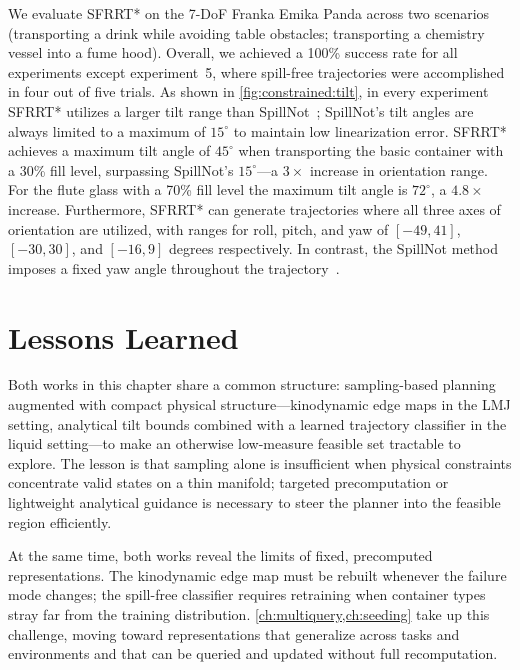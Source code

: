 We evaluate SFRRT* on the 7-DoF Franka Emika Panda across two scenarios (transporting a drink while avoiding table obstacles; transporting a chemistry vessel into a fume hood).
Overall, we achieved a 100\% success rate for all experiments except experiment~5, where spill-free trajectories were accomplished in four out of five trials.
As shown in \cref{fig:constrained:tilt}, in every experiment SFRRT* utilizes a larger tilt range than SpillNot~\cite{pendulum}; SpillNot's tilt angles are always limited to a maximum of $15^\circ$ to maintain low linearization error.
SFRRT* achieves a maximum tilt angle of $45^\circ$ when transporting the basic container with a 30\% fill level, surpassing SpillNot's $15^\circ$---a $3\times$ increase in orientation range.
For the flute glass with a 70\% fill level the maximum tilt angle is $72^\circ$, a $4.8\times$ increase.
Furthermore, SFRRT* can generate trajectories where all three axes of orientation are utilized, with ranges for roll, pitch, and yaw of $[-49, 41]$, $[-30, 30]$, and $[-16, 9]$ degrees respectively.
In contrast, the SpillNot method imposes a fixed yaw angle throughout the trajectory~\cite{pendulum}.

\section{Lessons Learned}
\label{sec:constrained:lessons}

Both works in this chapter share a common structure: sampling-based planning augmented with compact physical structure---kinodynamic edge maps in the LMJ setting, analytical tilt bounds combined with a learned trajectory classifier in the liquid setting---to make an otherwise low-measure feasible set tractable to explore.
The lesson is that sampling alone is insufficient when physical constraints concentrate valid states on a thin manifold; targeted precomputation or lightweight analytical guidance is necessary to steer the planner into the feasible region efficiently.

At the same time, both works reveal the limits of fixed, precomputed representations.
The kinodynamic edge map must be rebuilt whenever the failure mode changes; the spill-free classifier requires retraining when container types stray far from the training distribution.
\cref{ch:multiquery,ch:seeding} take up this challenge, moving toward representations that generalize across tasks and environments and that can be queried and updated without full recomputation.
